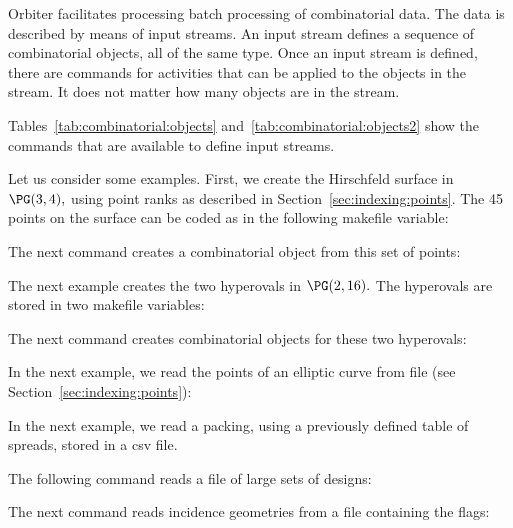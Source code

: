Orbiter facilitates processing batch processing of combinatorial data.
The data is described by means of input streams. 
An input stream defines a sequence of combinatorial objects, all of the same type. 
Once an input stream is defined, 
there are commands for activities that can be applied to the objects in the stream. 
It does not matter how many objects are in the stream. 

\bigskip


Tables~\ref{tab:combinatorial:objects} and~\ref{tab:combinatorial:objects2} 
show the commands that are available to define input streams. 

\bigskip

Let us consider some examples. 
First, we create the Hirschfeld surface in $\PG(3,4),$
using point ranks 
as described in Section~\ref{sec:indexing:points}.
The 45 points on the surface can be coded as in the following makefile variable:


The next command creates a combinatorial object 
from this set of points:


The next example creates the two hyperovals in $\PG(2,16).$ 
The hyperovals are stored in two makefile variables:




The next command creates combinatorial objects for these two hyperovals:
 

In the next example, we read the points 
of an elliptic curve from file 
(see Section~\ref{sec:indexing:points}):


In the next example, we read a packing, 
using a previously defined table of spreads, 
stored in a csv file.


The following command reads a file of large sets of designs:


The next command reads incidence geometries from a file containing the flags:



